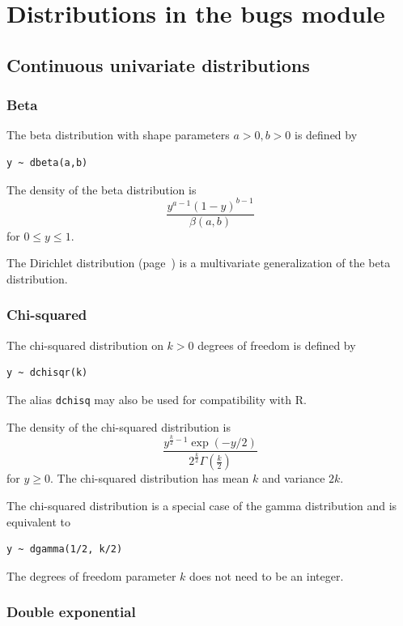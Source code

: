 \documentclass[11pt, a4paper, titlepage]{report}
\newcommand{\R}{\textsf{R}}
\begin{document}
\section{Distributions in the bugs module}
\label{section:bugs:distributions}

\subsection{Continuous univariate distributions}

\subsubsection{Beta}
\label{bugs:dbeta}

The beta distribution with shape parameters $a > 0, b > 0$ is defined by
\begin{verbatim}
y ~ dbeta(a,b)
\end{verbatim}
The density of the beta distribution is
\[
\frac{\textstyle y^{a-1}(1-y)^{b-1}}{\textstyle \beta(a,b)}
\]
for $0 \leq y \leq 1$.

The Dirichlet distribution (page~\pageref{bugs:ddirch}) is a
multivariate generalization of the beta distribution.

\subsubsection{Chi-squared}
\label{bugs:dchisqr}

The chi-squared distribution on $k > 0$ degrees of freedom is defined by
\begin{verbatim}
y ~ dchisqr(k)
\end{verbatim}
The alias \texttt{dchisq} may also be used for compatibility with \R.

The density of the chi-squared distribution is
\[
\frac{\textstyle y^{\frac{k}{2} - 1} \exp(-y/2)}
     {\textstyle 2^{\frac{k}{2}} \Gamma({\scriptstyle \frac{k}{2}})}
\]
for $y \geq 0$. The chi-squared distribution has mean $k$ and variance $2k$.

The chi-squared distribution is a special case of the gamma
distribution and is equivalent to
\begin{verbatim}
y ~ dgamma(1/2, k/2)
\end{verbatim}
The degrees of freedom parameter $k$ does not need to be an integer.

\subsubsection{Double exponential}
\label{bugs:ddexp}
\end{document}
